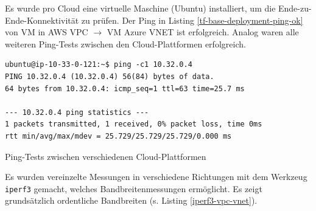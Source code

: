 Es wurde pro Cloud eine virtuelle Maschine (Ubuntu) installiert, um die Ende-zu-Ende-Konnektivität zu prüfen. Der Ping in Listing \ref{tf-base-deployment-ping-ok} von VM in AWS VPC $\rightarrow$ VM Azure VNET ist erfolgreich. Analog waren alle weiteren Ping-Tests zwischen den Cloud-Plattformen erfolgreich.
\begin{listing}[h]
\begin{verbatim}
ubuntu@ip-10-33-0-121:~$ ping -c1 10.32.0.4
PING 10.32.0.4 (10.32.0.4) 56(84) bytes of data.
64 bytes from 10.32.0.4: icmp_seq=1 ttl=63 time=25.7 ms

--- 10.32.0.4 ping statistics ---
1 packets transmitted, 1 received, 0% packet loss, time 0ms
rtt min/avg/max/mdev = 25.729/25.729/25.729/0.000 ms
\end{verbatim}
\caption{Ping-Tests zwischen verschiedenen Cloud-Plattformen}
\label{tf-base-deployment-ping-ok}
\end{listing}\FloatBarrier
Es wurden vereinzelte Messungen in verschiedene Richtungen mit dem Werkzeug \texttt{iperf3} gemacht, welches Bandbreitenmessungen ermöglicht. Es zeigt grundsätzlich \glqq ordentliche\grqq{} Bandbreiten (s. Listing \ref{iperf3-vpc-vnet}).


